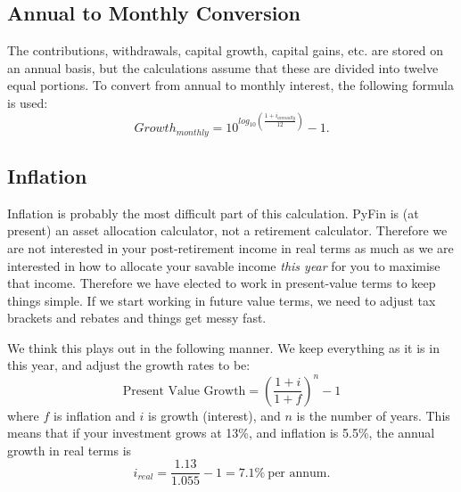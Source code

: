 \documentclass[a4paper, justified]{tufte-handout}
\begin{document}
\subsection{Annual to Monthly Conversion}
The contributions, withdrawals, capital growth, capital gains, etc. are stored on an annual basis, but the calculations assume that these are divided into twelve equal portions. To convert from annual to monthly interest, the following formula is used:
\begin{equation}
Growth_{monthly} = 10^{log_{10}\left(\frac{1 +i_{annually}}{12}\right)} - 1.
\end{equation}

\subsection{Inflation}
Inflation is probably the most difficult part of this calculation. PyFin is (at present) an asset allocation calculator, not a retirement calculator. Therefore we are not interested in your post-retirement income in real terms as much as we are interested in how to allocate your savable income \textit{this year} for you to maximise that income. Therefore we have elected to work in present-value terms to keep things simple. If we start working in future value terms, we need to adjust tax brackets and rebates and things get messy fast.

We think this plays out in the following manner. We keep everything as it is in this year, and adjust the growth rates to be:
\begin{equation}
\textrm{Present Value Growth} = \left(\frac{1+i}{1+f}\right)^n - 1
\end{equation}
where $f$ is inflation and $i$ is growth (interest), and $n$ is the number of years. This means that if your investment grows at 13\%, and inflation is 5.5\%, the annual growth in real terms is 
\begin{equation}
i_{real} = \frac{1.13}{1.055} - 1=7.1\%~\textrm{per annum.}
\end{equation}
\end{document}
